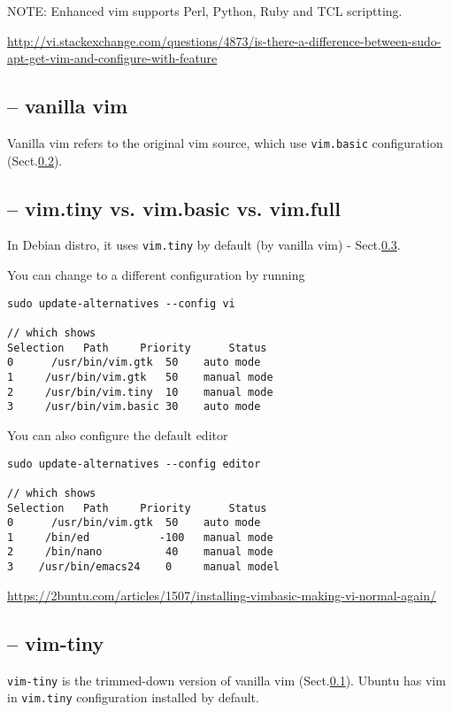 NOTE: Enhanced vim supports Perl, Python, Ruby and TCL scriptting.

\url{http://vi.stackexchange.com/questions/4873/is-there-a-difference-between-sudo-apt-get-vim-and-configure-with-feature}

\subsection{-- vanilla vim}
\label{sec:vim-vanilla}

Vanilla vim refers to the original vim source, which use \verb!vim.basic!
configuration (Sect.\ref{sec:vim.basic}).

\subsection{-- vim.tiny vs. vim.basic vs. vim.full}
\label{sec:vim.basic}
\label{sec:vim.full}
\label{sec:vim.tiny}

In Debian distro, it uses \verb!vim.tiny! by default (by vanilla vim) -
Sect.\ref{sec:vim-tiny}.

You can change to a different configuration by running
\begin{verbatim}
sudo update-alternatives --config vi

// which shows
Selection   Path     Priority      Status
0      /usr/bin/vim.gtk  50    auto mode
1     /usr/bin/vim.gtk   50    manual mode
2     /usr/bin/vim.tiny  10    manual mode
3     /usr/bin/vim.basic 30    auto mode
\end{verbatim}

You can also configure the default editor
\begin{verbatim}
sudo update-alternatives --config editor

// which shows
Selection   Path     Priority      Status
0      /usr/bin/vim.gtk  50    auto mode
1     /bin/ed           -100   manual mode
2     /bin/nano          40    manual mode
3    /usr/bin/emacs24    0     manual model
\end{verbatim}

\url{https://2buntu.com/articles/1507/installing-vimbasic-making-vi-normal-again/}



\subsection{-- vim-tiny}
\label{sec:vim-tiny}


\verb!vim-tiny! is the trimmed-down version of vanilla vim
(Sect.\ref{sec:vim-vanilla}). Ubuntu has vim in 
\verb!vim.tiny! configuration installed by default.

